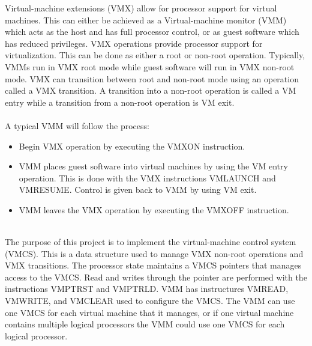 \documentclass[onecolumn, draftclsnofoot,10pt, compsoc]{IEEEtran}
\begin{document}
  Virtual-machine extensions (VMX) allow for processor support for virtual machines.
  This can either be achieved as a Virtual-machine monitor (VMM) which acts as the host and has full processor control, or as guest software which has reduced privileges.
  VMX operations provide processor support for virtualization.
  This can be done as either a root or non-root operation.
  Typically, VMMs run in VMX root mode while guest software will run in VMX non-root mode.
  VMX can transition between root and non-root mode using an operation called a VMX transition.
  A transition into a non-root operation is called a VM entry while a transition from a non-root operation is VM exit.
  \ \\ \ \\
  A typical VMM will follow the process:
  \begin{itemize}
      \item Begin VMX operation by executing the VMXON instruction.
      \item VMM places guest software into virtual machines by using the VM entry operation. This is done with the VMX instructions VMLAUNCH and VMRESUME. Control is given back to VMM by using VM exit.
      \item VMM leaves the VMX operation by executing the VMXOFF instruction.
  \end{itemize}
  \ \\
  The purpose of this project is to implement the virtual-machine control system (VMCS). This is a data structure used to manage VMX non-root operations and VMX transitions.
  The processor state maintains a VMCS pointers that manages access to the VMCS.
  Read and writes through the pointer are performed with the instructions VMPTRST and VMPTRLD.
  VMM has instructures VMREAD, VMWRITE, and VMCLEAR used to configure the VMCS.
  The VMM can use one VMCS for each virtual machine that it manages, or if one virtual machine contains multiple logical processors the VMM could use one VMCS for each logical processor.
  
\end{document}
